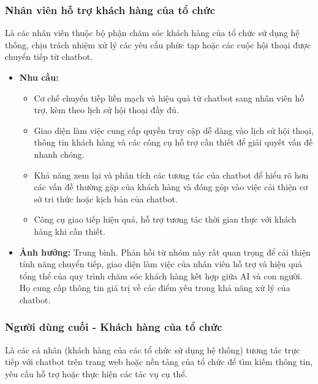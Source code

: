 \subsubsection{Nhân viên hỗ trợ khách hàng của tổ chức}

Là các nhân viên thuộc bộ phận chăm sóc khách hàng của tổ chức sử dụng hệ thống, chịu trách nhiệm xử lý các yêu cầu phức tạp hoặc các cuộc hội thoại được chuyển tiếp từ chatbot.

\begin{itemize}
    \item \textbf{Nhu cầu:}
    \begin{itemize}
        \item Cơ chế chuyển tiếp liền mạch và hiệu quả từ chatbot sang nhân viên hỗ trợ, kèm theo lịch sử hội thoại đầy đủ.
        \item Giao diện làm việc cung cấp quyền truy cập dễ dàng vào lịch sử hội thoại, thông tin khách hàng và các công cụ hỗ trợ cần thiết để giải quyết vấn đề nhanh chóng.
        \item Khả năng xem lại và phân tích các tương tác của chatbot để hiểu rõ hơn các vấn đề thường gặp của khách hàng và đóng góp vào việc cải thiện cơ sở tri thức hoặc kịch bản của chatbot.
        \item Công cụ giao tiếp hiệu quả, hỗ trợ tương tác thời gian thực với khách hàng khi cần thiết.
    \end{itemize}
    \item \textbf{Ảnh hưởng:} Trung bình. Phản hồi từ nhóm này rất quan trọng để cải thiện tính năng chuyển tiếp, giao diện làm việc của nhân viên hỗ trợ và hiệu quả tổng thể của quy trình chăm sóc khách hàng kết hợp giữa AI và con người. Họ cung cấp thông tin giá trị về các điểm yếu trong khả năng xử lý của chatbot.
\end{itemize}


\subsubsection{Người dùng cuối - Khách hàng của tổ chức}

Là các cá nhân (khách hàng của các tổ chức sử dụng hệ thống) tương tác trực tiếp với chatbot trên trang web hoặc nền tảng của tổ chức để tìm kiếm thông tin, yêu cầu hỗ trợ hoặc thực hiện các tác vụ cụ thể.

